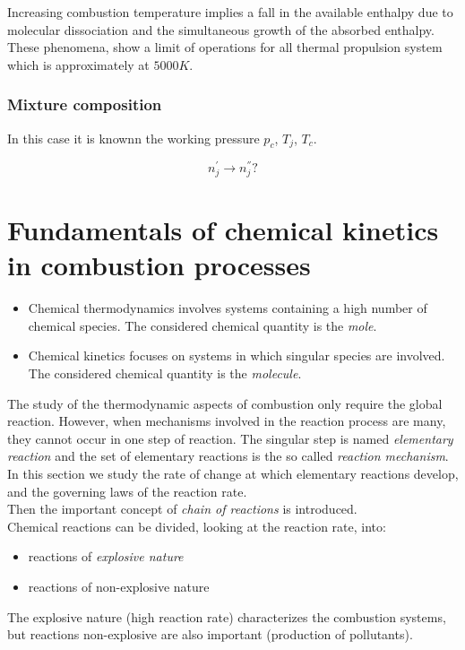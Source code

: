 \documentclass[12pt]{article}
\begin{document}
Increasing combustion temperature implies a fall in the available enthalpy due to molecular dissociation and the simultaneous growth of the absorbed enthalpy.\\
These phenomena, show a limit of operations for all thermal propulsion system which is approximately at $5000 K$.

\subsubsection{Mixture composition}

In this case it is knownn the working pressure $p_{c}$, $T_{j}$, $T_{c}$.

\begin{equation}
    n_{j}^{'} \rightarrow n_{j}^{''}?
\end{equation}

\newpage

\section{Fundamentals of chemical kinetics in combustion processes}

\begin{itemize}
    \item Chemical thermodynamics involves systems containing a high number of chemical species. The considered chemical quantity is the \textit{mole}.
    \item Chemical kinetics focuses on systems in which singular species are involved. The considered chemical quantity is the \textit{molecule}.
\end{itemize}

The study of the thermodynamic aspects of combustion only require the global reaction. However, when mechanisms involved in the reaction process are many, they cannot occur in one step of reaction. The singular step is named \textit{elementary reaction} and the set of elementary reactions is the so called \textit{reaction mechanism}.\\
In this section we study the rate of change at which elementary reactions develop, and the governing laws of the reaction rate.\\
Then the important concept of \textit{chain of reactions} is introduced.\\
Chemical reactions can be divided, looking at the reaction rate, into:
\begin{itemize}
    \item reactions of \textit{explosive nature}
    \item reactions of non-explosive nature
\end{itemize}
The explosive nature (high reaction rate) characterizes the combustion systems, but reactions non-explosive are also important (production of pollutants).
\end{document}
